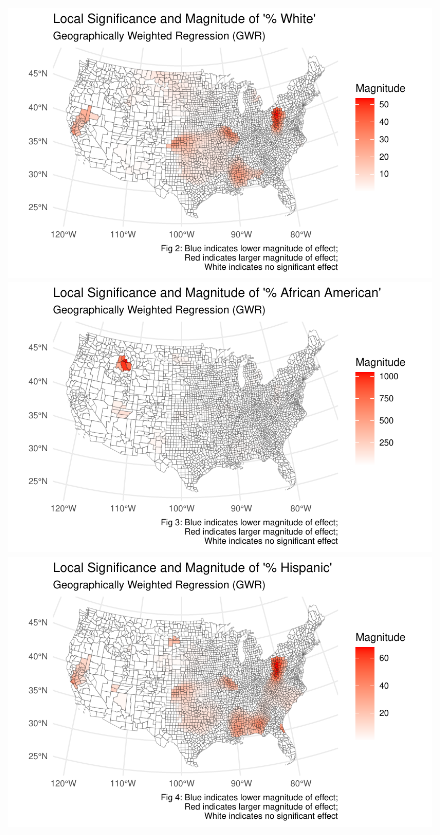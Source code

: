 \documentclass[
]{article}
\begin{document}
\begin{figure}

\begin{minipage}{0.50\linewidth}
\includegraphics{report_files/figure-pdf/unnamed-chunk-3-1.pdf}\end{minipage}%
%
\begin{minipage}{0.50\linewidth}
\includegraphics{report_files/figure-pdf/unnamed-chunk-3-2.pdf}\end{minipage}%
\newline
\begin{minipage}{0.50\linewidth}
\includegraphics{report_files/figure-pdf/unnamed-chunk-3-3.pdf}\end{minipage}%

\end{figure}
\end{document}
